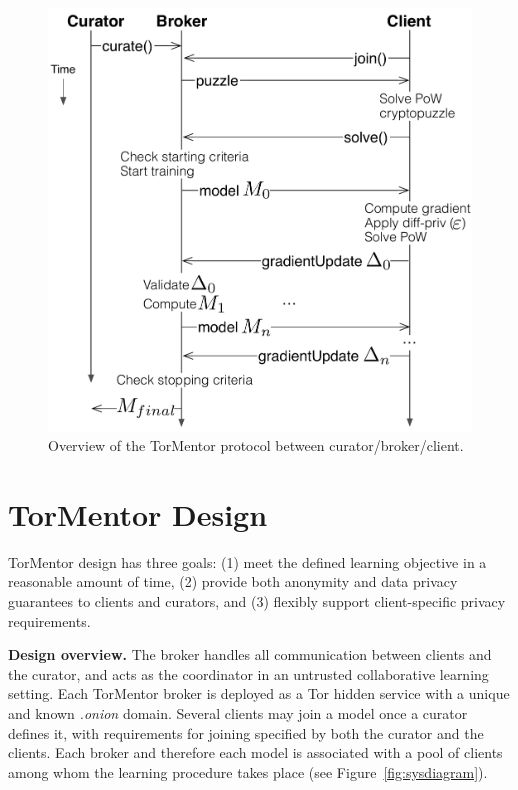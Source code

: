 \begin{figure}[t]
  \centering
  \includegraphics[width=.9\linewidth]{fig/tormentor-protocol.pdf}
  \caption{Overview of the TorMentor protocol between
    curator/broker/client.
    }
  \label{fig:protocol}
\end{figure}


\chapter{TorMentor Design}
\label{sec:design}

TorMentor design has three goals: (1) meet the defined learning
objective in a reasonable amount of time, (2) provide both anonymity
and data privacy guarantees to clients and curators, and (3) flexibly
support client-specific privacy requirements.

\textbf{Design overview.} The broker handles all communication between
clients and the curator, and acts as the coordinator in an untrusted
collaborative learning setting. Each TorMentor broker is deployed as a
Tor hidden service with a unique and known \textit{.onion}
domain. Several clients may join a model once a curator defines it,
with requirements for joining specified by both the curator and the
clients. Each broker and therefore each model is associated with a pool
of clients among whom the learning procedure takes place (see 
Figure~\ref{fig:sysdiagram}).

